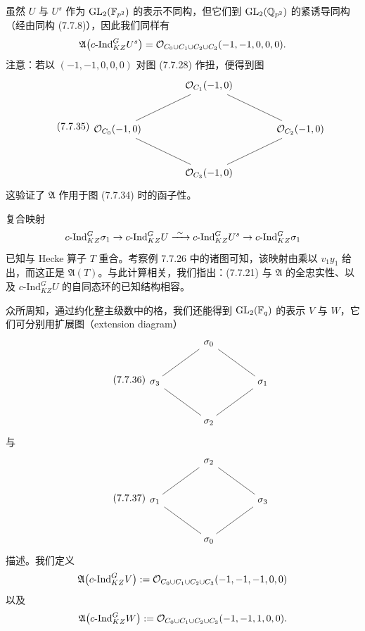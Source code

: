
虽然 $U$ 与 $U^s$ 作为 $\mathrm{GL}_2(\mathbb{F}_{p^2})$ 的表示不同构，但它们到 $\mathrm{GL}_2(\mathbb{Q}_{p^2})$ 的紧诱导同构（经由同构 (7.7.8)），因此我们同样有
\[
\mathfrak A\bigl(c\text{-}\mathrm{Ind}_{KZ}^GU^s\bigr)=\mathcal{O}_{C_0\cup C_1\cup C_2\cup C_3}(-1,-1,0,0,0).
\]
注意：若以 $(-1,-1,0,0,0)$ 对图 (7.7.28) 作扭，便得到图
\begin{equation}\tag{7.7.35}
\begin{tikzcd}[column sep=large,row sep=large]
& \OO_{C_1}(-1,0)\arrow[dl,no head]\arrow[dr,no head] & \\
\OO_{C_0}(-1,0)\arrow[dr,no head] & & \OO_{C_2}(-1,0)\arrow[dl,no head]\\
& \OO_{C_3}(-1,0) &
\end{tikzcd}
\end{equation}
这验证了 $\mathfrak A$ 作用于图 (7.7.34) 时的函子性。

复合映射
\[
c\text{-}\mathrm{Ind}_{KZ}^G\sigma_1\rightarrow c\text{-}\mathrm{Ind}_{KZ}^GU\xrightarrow{\ \sim\ } c\text{-}\mathrm{Ind}_{KZ}^GU^s\rightarrow c\text{-}\mathrm{Ind}_{KZ}^G\sigma_1
\]
已知与 Hecke 算子 $T$ 重合。考察例 7.7.26 中的诸图可知，该映射由乘以 $v_1y_1$ 给出，而这正是 $\mathfrak A(T)$。与此计算相关，我们指出：(7.7.21) 与 $\mathfrak A$ 的全忠实性、以及 $c\text{-}\mathrm{Ind}_{KZ}^GU$ 的自同态环的已知结构相容。

众所周知，通过约化整主级数中的格，我们还能得到 $\mathrm{GL}_2(\mathbb{F}_q)$ 的表示 $V$ 与 $W$，它们可分别用扩展图（extension diagram）
\begin{equation}\tag{7.7.36}
\begin{tikzcd}[column sep=large,row sep=large]
& \sigma_0\arrow[dl,no head]\arrow[dr,no head] & \\
\sigma_3\arrow[dr,no head] & & \sigma_1\arrow[dl,no head]\\
& \sigma_2 &
\end{tikzcd}
\end{equation}
与
\begin{equation}\tag{7.7.37}
\begin{tikzcd}[column sep=large,row sep=large]
& \sigma_2\arrow[dl,no head]\arrow[dr,no head] & \\
\sigma_1\arrow[dr,no head] & & \sigma_3\arrow[dl,no head]\\
& \sigma_0 &
\end{tikzcd}
\end{equation}
描述。我们定义
\[
\mathfrak A\bigl(c\text{-}\mathrm{Ind}_{KZ}^GV\bigr):=\mathcal{O}_{C_0\cup C_1\cup C_2\cup C_3}(-1,-1,-1,0,0)
\]
以及
\[
\mathfrak A\bigl(c\text{-}\mathrm{Ind}_{KZ}^GW\bigr):=\mathcal{O}_{C_0\cup C_1\cup C_2\cup C_3}(-1,-1,1,0,0).
\]

